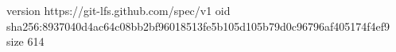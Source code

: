 version https://git-lfs.github.com/spec/v1
oid sha256:8937040d4ac64c08bb2bf96018513fe5b105d105b79d0c96796af405174f4ef9
size 614

